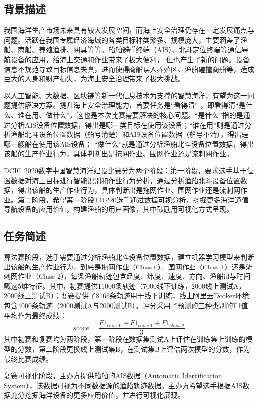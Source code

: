 \documentclass[UTF8, 12pt]{ctexart}
\begin{document}
		\subsection{背景描述}
		我国海洋生产市场未来具有较大发展空间，而海上安全治理仍存在一定发展痛点与问题。活跃在我国专属经济海域的各类目标种类繁多、规模庞大，主要涵盖了渔船、商船、养殖渔排、网具等等。船舶避碰终端（AIS）、北斗定位终端等通信导航设备的应用，给海上交通和作业带来了极大便利， 但也产生了新的问题。设备信息不规范导致目标信息失真，进而使得商船误入养殖区、渔船碰撞商船等，造成巨大的人身和财产损失，为海上安全治理带来了极大挑战。

		以人工智能、大数据、区块链等新一代信息技术为支撑的智慧海洋，有望为这一问题提供解决方案。提升海上安全治理能力，首要任务是“看得清” ，即看得清“是什么、谁在用、做什么”，这也是本次比赛需要解决的核心问题。“是什么”指的是通过分析AIS设备位置数据，得出是哪一类目标在使用该设备；“谁在用”则是通过分析渔船北斗设备位置数据（船号清楚）和AIS设备位置数据（船号不清），得出是哪一艘船在使用该AIS设备； “做什么”就是通过分析渔船北斗设备位置数据，得出该船的生产作业行为，具体判断出是拖网作业、围网作业还是流刺网作业。

		DCIC 2020数字中国智慧海洋建设比赛分为两个阶段：第一阶段，要求选手基于位置数据对海上目标进行智能识别和作业行为分析，通过分析渔船北斗设备位置数据，得出该船的生产作业行为，具体判断出是拖网作业、围网作业还是流刺网作业。第二阶段，希望第一阶段TOP20选手通过数据可视分析，挖掘更多海洋通信导航设备的应用价值，构建渔船的用户画像，其中鼓励用可视化方式呈现。

		\subsection{任务简述}
		算法赛阶段，选手需要通过分析渔船北斗设备位置数据，建立机器学习模型来判断出该船的生产作业行为，到底是拖网作业（Class 0）、围网作业（Class 1）还是流刺网作业（Class 2），每条渔船轨迹包含经度、纬度、速度、方向、渔船id与时间戳这5维特征。其中，初赛提供11000条轨迹（7000线下训练，2000线上测试A，2000线上测试B）；复赛提供了8166条轨迹用于线下训练，线上阿里云Dcoker环境包含4000条轨迹（2000测试A与2000测试B）。评分采用了预测的三种类别的F1值平均作为最终成绩：
		\begin{equation}
			score = \frac{F1_{class \; 0} + F1_{class \; 1} + F1_{class \; 2}}{3}
		\end{equation}
		其中初赛和复赛均为两阶段，第一阶段在数据集测试A上评估在训练集上训练的模型的分数，第二阶段更换线上测试集B，在测试集B上评估两次模型的分数，作为最终比赛成绩。

		复赛可视化阶段，主办方提供船舶的AIS数据（Automatic Identification System），该数据可视为不同数据源的渔船轨迹数据。主办方希望选手根据AIS数据充分挖掘海洋设备的更多应用价值，并进行可视化展现。
\end{document}
